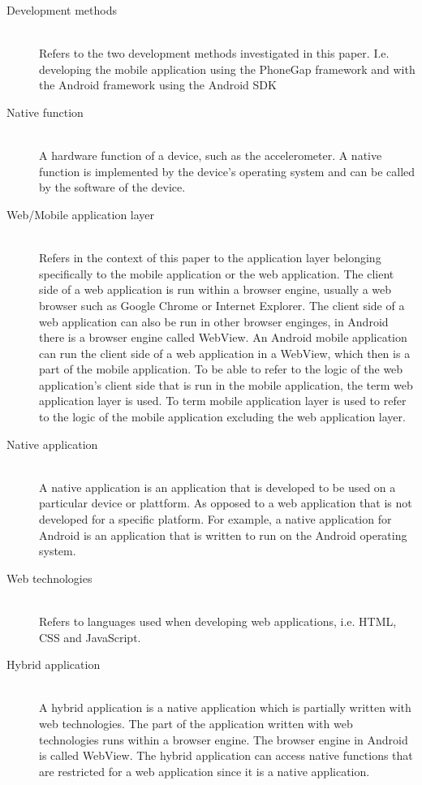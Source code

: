\begin{description}
  \item[Development methods] \hfill \\
    Refers to the two development methods investigated in this paper. I.e. developing the mobile application using the PhoneGap framework and with the Android framework using the Android SDK
  \item[Native function] \hfill \\
     A hardware function of a device, such as the accelerometer. A native function is implemented by the device's operating system and can be called by the software of the device.     
  \item[Web/Mobile application layer] \hfill \\
	Refers in the context of this paper to the application layer belonging specifically to the mobile application or the web application. The client side of a web application is run within a browser engine, usually a web browser such as Google Chrome or Internet Explorer. The client side of a web application can also be run in other browser enginges, in Android there is a browser engine called WebView. An Android mobile application can run the client side of a web application in a WebView, which then is a part of the mobile application. To be able to refer to the logic of the web application's client side that is run in the mobile application, the term web application layer is used. To term mobile application layer is used to refer to the logic of the mobile application excluding the web application layer.
	\item[Native application] \hfill \\
	A native application is an application that is developed to be used on a particular device or plattform. As opposed to a web application that is not developed for a specific platform. For example, a native application for Android is an application that is written to run on the Android operating system.
\item[Web technologies] \hfill \\
	Refers to languages used when developing web applications, i.e. HTML, CSS and JavaScript.
\item[Hybrid application] \hfill \\
	A hybrid application is a native application which is partially written with web technologies. The part of the application written with web technologies runs within a browser engine. The browser engine in Android is called WebView. The hybrid application can access native functions that are restricted for a web application since it is a native application.
\end{description}

